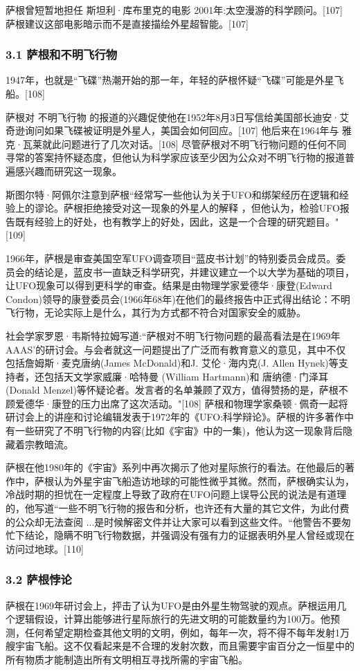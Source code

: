 萨根曾短暂地担任 斯坦利·库布里克的电影 2001年:太空漫游的科学顾问。[107] 萨根建议这部电影暗示而不是直接描绘外星超智能。[107]
\subsubsection{3.1 萨根和不明飞行物}
1947年，也就是“飞碟”热潮开始的那一年，年轻的萨根怀疑“飞碟”可能是外星飞船。[108]

萨根对 不明飞行物 的报道的兴趣促使他在1952年8月3日写信给美国部长迪安·艾奇逊询问如果飞碟被证明是外星人，美国会如何回应。[107] 他后来在1964年与 雅克·瓦莱就此问题进行了几次对话。[108] 尽管萨根对不明飞行物问题的任何不同寻常的答案持怀疑态度，但他认为科学家应该至少因为公众对不明飞行物的报道普遍感兴趣而研究这一现象。

斯图尔特·阿佩尔注意到萨根“经常写一些他认为关于UFO和绑架经历在逻辑和经验上的谬论。萨根拒绝接受对这一现象的外星人的解释 ，但他认为，检验UFO报告既有经验上的好处，也有教学上的好处，因此，这是一个合理的研究题目。"[109]

1966年，萨根是审查美国空军UFO调查项目“蓝皮书计划”的特别委员会成员。委员会的结论是，蓝皮书一直缺乏科学研究，并建议建立一个以大学为基础的项目，让UFO现象可以得到更科学的审查。结果是由物理学家爱德华·康登(Edward Condon)领导的康登委员会(1966年68年)在他们的最终报告中正式得出结论：不明飞行物，无论实际上是什么，其行为方式都不符合对国家安全的威胁。

社会学家罗恩·韦斯特拉姆写道:“萨根对不明飞行物问题的最高看法是在1969年AAAS'的研讨会。与会者就这一问题提出了广泛而有教育意义的意见，其中不仅包括詹姆斯·麦克唐纳(James McDonald)和J. 艾伦·海内克(J. Allen Hynek)等支持者，还包括天文学家威廉·哈特曼 (William Hartmann)和 唐纳德·门泽耳(Donald Menzel)等怀疑论者。发言者的名单兼顾了双方，值得赞扬的是，萨根不顾爱德华·康登的压力出席了这次活动。"[108] 萨根和物理学家桑顿·佩奇一起将研讨会上的讲座和讨论编辑发表于1972年的《UFO:科学辩论》。萨根的许多著作中有一些研究了不明飞行物的内容(比如《宇宙》中的一集)，他认为这一现象背后隐藏着宗教暗流。

萨根在他1980年的《宇宙》系列中再次揭示了他对星际旅行的看法。在他最后的著作中，萨根认为外星宇宙飞船造访地球的可能性微乎其微。然而，萨根确实认为，冷战时期的担忧在一定程度上导致了政府在UFO问题上误导公民的说法是有道理的，他写道“一些不明飞行物的报告和分析，也许还有大量的其它文件，为此付费的公众却无法查阅 ...是时候解密文件并让大家可以看到这些文件。“他警告不要匆忙下结论，隐瞒不明飞行物数据，并强调没有强有力的证据表明外星人曾经或现在访问过地球。[110]
\subsubsection{3.2 萨根悖论}
萨根在1969年研讨会上，抨击了认为UFO是由外星生物驾驶的观点。萨根运用几个逻辑假设，计算出能够进行星际旅行的先进文明的可能数量约为100万。他预测，任何希望定期检查其他文明的文明，例如，每年一次，将不得不每年发射1万艘宇宙飞船。这不仅看起来是不合理的发射次数，而且需要宇宙百分之一恒星中的所有物质才能制造出所有文明相互寻找所需的宇宙飞船。

